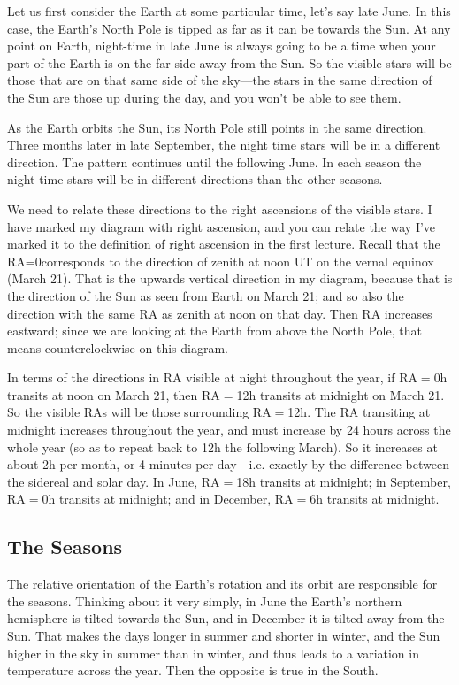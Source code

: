 \documentclass[12pt, preprint]{aastex}
\begin{document}
Let us first consider the Earth at some particular time, let's say
late June. In this case, the Earth's North Pole is tipped as far as it
can be towards the Sun. At any point on Earth, night-time in late June
is always going to be a time when your part of the Earth is on the far
side away from the Sun. So the visible stars will be those that are on
that same side of the sky---the stars in the same direction of the Sun
are those up during the day, and you won't be able to see them.

As the Earth orbits the Sun, its North Pole still points in the same
direction. Three months later in late September, the night time stars
will be in a different direction. The pattern continues until the
following June. In each season the night time stars will be in
different directions than the other seasons.

We need to relate these directions to the right ascensions of the
visible stars. I have marked my diagram with right ascension, and you
can relate the way I've marked it to the definition of right ascension
in the first lecture. Recall that the RA=0\degree corresponds to the
direction of zenith at noon UT on the vernal equinox (March 21). That
is the upwards vertical direction in my diagram, because that is the
direction of the Sun as seen from Earth on March 21; and so also the
direction with the same RA as zenith at noon on that day. Then RA
increases eastward; since we are looking at the Earth from above the
North Pole, that means counterclockwise on this diagram.

In terms of the directions in RA visible at night throughout the year,
if RA$=$0h transits at noon on March 21, then RA$=$12h transits at
midnight on March 21. So the visible RAs will be those surrounding
RA$=$12h. The RA transiting at midnight increases throughout the year,
and must increase by 24 hours across the whole year (so as to repeat
back to 12h the following March).  So it increases at about 2h per
month, or 4 minutes per day---i.e. exactly by the difference between
the sidereal and solar day.  In June, RA$=$18h transits at midnight;
in September, RA$=$0h transits at midnight; and in December, RA$=$6h
transits at midnight.

\subsection{The Seasons}

The relative orientation of the Earth's rotation and its orbit are
responsible for the seasons. Thinking about it very simply, in June
the Earth's northern hemisphere is tilted towards the Sun, and in
December it is tilted away from the Sun. That makes the days longer in
summer and shorter in winter, and the Sun higher in the sky in summer
than in winter, and thus leads to a variation in temperature across
the year. Then the opposite is true in the South.
\end{document}

